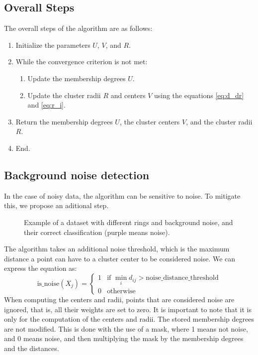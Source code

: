 \documentclass[conference]{IEEEtran}
\begin{document}
\subsection{Overall Steps}
The overall steps of the algorithm are as follows:
\begin{enumerate}
    \item Initialize the parameters $U$, $V$, and $R$.
    \item While the convergence criterion is not met:
    \begin{enumerate}
        \item Update the membership degrees $U$.
        \item Update the cluster radii $R$ and centers $V$ using the equations \eqref{eq:d_dr} and \eqref{eq:r_i}.
    \end{enumerate}
    \item Return the membership degrees $U$, the cluster centers $V$, and the cluster radii $R$.
    \item End.
\end{enumerate}

\subsection{Background noise detection}
In the case of noisy data, the algorithm can be sensitive to noise. To mitigate this, we propose an aditional step.
\begin{figure}[H]
    \centering
    \resizebox{0.9\linewidth}{!}{}
    \label{fig:noisy_bg}
    \caption{Example of a dataset with different rings and background noise, and their correct classification (purple means noise).}
\end{figure}
The algorithm takes an additional noise threshold, which is the maximum distance a point can have to a cluster center to be considered noise.
We can express the equation as:
\begin{equation}
    \text{is\_noise}(X_j) = \begin{cases}
        1 & \text{if } \min_{i} d_{ij} > \text{noise\_distance\_threshold} \\
        0 & \text{otherwise}
    \end{cases}
\end{equation}
When computing the centers and radii, points that are considered noise are ignored, that is, all their weights are set to zero.
It is important to note that it is only for the computation of the centers and radii. The stored membership degrees are not modified.
This is done with the use of a mask, where 1 means not noise, and 0 means noise, and then multiplying the mask by the membership degrees and the distances.
\end{document}
